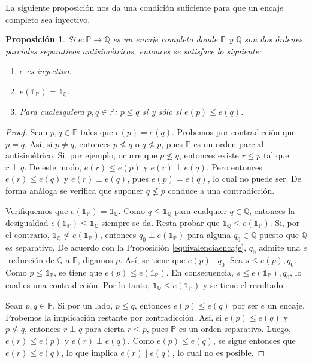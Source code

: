 \documentclass[11pt]{unam_tesis1}
\theoremstyle{MyThmStyle}
\theoremstyle{definition}
\theoremstyle{plain}
\newtheorem{proposition}[definition]{Proposici\'on}
\theoremstyle{remark}
\let\leq\leqslant
\begin{document}
La siguiente proposici\'on nos da una condici\'on suficiente para que un encaje completo sea inyectivo.

\begin{proposition}
Si $e:\mathbb P\to \mathbb Q$ es un encaje completo donde $\mathbb P$ y $\mathbb Q$ son dos \'ordenes parciales separativos antisim\'etricos, entonces se satisface lo siguiente:
\begin{enumerate}
\item $e$ es inyectivo.
\item $e(\mathds 1_{\mathbb P})=\mathds 1_{\mathbb Q}$.
\item Para cualesquiera $p,q\in \mathbb P$: $p\leq q$ si y s\'olo si $e(p)\leq e(q)$.
\end{enumerate}

\end{proposition}

\begin{proof}
Sean $p,q\in \mathbb P$ tales que $e(p)=e(q)$. Probemos por contradicci\'on que $p=q$. As\'i, si $p\neq q$, entonces $p\nleq q$ o $q\nleq p$, pues $\mathbb P$ es un orden parcial antisim\'etrico. Si, por ejemplo, ocurre que $p\nleq q$, entonces existe $r\leq p$ tal que $r\perp q$. De este modo, $e(r)\leq e(p)$ y $e(r)\perp e(q)$. Pero entonces $e(r)\leq e(q)$ y $e(r)\perp e(q)$, pues $e(p)=e(q)$, lo cual no puede ser. De forma an\'aloga se verifica que suponer $q\nleq p$ conduce a una contradicci\'on.

Verifiquemos que $e(\mathds 1_{\mathbb P})=\mathds 1_{\mathbb Q}$. Como $q\leq \mathds 1_{\mathbb Q}$ para cualquier $q\in \mathbb Q$, entonces la desigualdad $e(\mathds 1_{\mathbb P})\leq \mathds 1_{\mathbb Q}$ siempre se da. Resta probar que $\mathds 1_{\mathbb Q}\leq e(\mathds 1_{\mathbb P})$. Si, por el contrario, $\mathds 1_{\mathbb Q}\nleq e(\mathds 1_{\mathbb P})$, entonces $q_0\perp e(\mathds 1_{\mathbb P})$ para alguna $q_0\in \mathbb Q$ puesto que $\mathbb Q$ es separativo. De acuerdo con la Proposici\'on \ref{equivalenciaencaje}, $q_0$ admite una $e$-reducci\'on de $\mathbb Q$ a $\mathbb P$, digamos $p$. As\'i, se tiene que $e(p)\mid q_0$. Sea $s\leq e(p),q_0$. Como $p\leq \mathds 1_{\mathbb P}$, se tiene que $e(p)\leq e(\mathds 1_{\mathbb P})$. En consecuencia, $s\leq e(\mathds 1_{\mathbb P}), q_0$, lo cual es una contradicci\'on. Por lo tanto, $\mathds 1_{\mathbb Q}\leq e(\mathds 1_{\mathbb P})$ y se tiene el resultado.

Sean $p,q\in \mathbb P$. Si por un lado, $p\leq q$, entonces $e(p)\leq e(q)$ por ser $e$ un encaje. Probemos la implicaci\'on restante por contradicci\'on. As\'i, si $e(p)\leq e(q)$ y $p\nleq q$, entonces $r\perp q$ para cierta $r\leq p$, pues $\mathbb P$ es un orden separativo. Luego, $e(r)\leq e(p)$ y $e(r)\perp e(q)$. Como $e(p)\leq e(q)$, se sigue entonces que $e(r)\leq e(q)$, lo que implica $e(r)\mid e(q)$, lo cual no es posible.
\end{proof}
\end{document}

